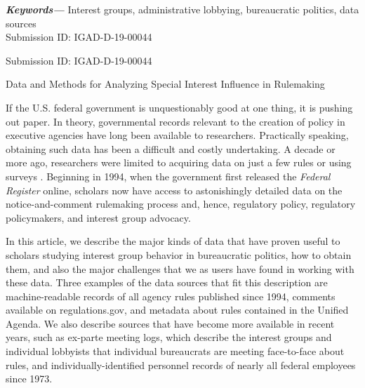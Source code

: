 \documentclass[12pt,notitlepage]{article}
\newcounter{cor}
\providecommand{\keywords}[1]
{
	\small	
	\textbf{\textit{Keywords---}} #1
}
\begin{document}
	\keywords{Interest groups, administrative lobbying, bureaucratic politics, data sources} \\
	
	Submission ID: IGAD-D-19-00044
	\thispagestyle{empty}
	
	\newpage
	\clearpage
	
	\doublespacing
	
	\noindent Submission ID: IGAD-D-19-00044

\begin{center}
\large{Data and Methods for Analyzing Special Interest Influence in Rulemaking}
\end{center}

If the U.S. federal government is unquestionably good at one thing, it
is pushing out paper. In theory, governmental records relevant to the
creation of policy in executive agencies have long been available to
researchers. Practically speaking, obtaining such data has been a
difficult and costly undertaking. A decade or more ago, researchers were
limited to acquiring data on just a few rules
\citep[e.g.,][]{Golden_JPART_1998} or using surveys
\citep[e.g.,][]{Furlong_JPART_2004}. Beginning in 1994, when the
government first released the \emph{Federal Register} online, scholars
now have access to astonishingly detailed data on the notice-and-comment
rulemaking process and, hence, regulatory policy, regulatory
policymakers, and interest group advocacy.

In this article, we describe the major kinds of data that have proven
useful to scholars studying interest group behavior in bureaucratic
politics, how to obtain them, and also the major challenges that we as
users have found in working with these data. Three examples of the data
sources that fit this description are machine-readable records of all
agency rules published since 1994, comments available on
regulations.gov, and metadata about rules contained in the Unified
Agenda. We also describe sources that have become more available in
recent years, such as ex-parte meeting logs, which describe the interest
groups and individual lobbyists that individual bureaucrats are meeting
face-to-face about rules, and individually-identified personnel records
of nearly all federal employees since 1973.
\end{document}

